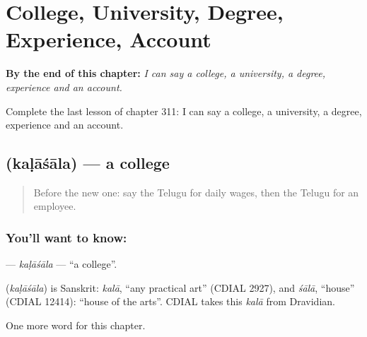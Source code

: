 
\chapter{College, University, Degree, Experience, Account}
\label{ch:te-college-university-degree-experience-account}

\begin{chapteropening}
\textbf{By the end of this chapter:} \emph{I can say a college, a university, a degree, experience and an account.}

Complete the last lesson of chapter 311: I can say a college, a university, a degree, experience and an account.
\end{chapteropening}

\section[\texorpdfstring{\te{కళాశాల} (kaḷāśāla)}{కళాశాల (kaḷāśāla)}]{ (kaḷāśāla) — a college}

\label{lesson:TE-C311-kalasala}



\begin{quote}
Before the new one: say the Telugu for daily wages, then the Telugu for an employee.
\end{quote}

\subsection*{You'll want to know: }
\textbf{} — \emph{kaḷāśāla} — \textquotedblleft{}a college\textquotedblright{}.

\begin{cousinweb}
\textbf{} (\emph{kaḷāśāla}) is Sanskrit: \emph{kalā}, \textquotedblleft{}any practical art\textquotedblright{} (CDIAL 2927), and \emph{śālā}, \textquotedblleft{}house\textquotedblright{} (CDIAL 12414): \textquotedblleft{}house of the arts\textquotedblright{}. CDIAL takes this \emph{kalā} from Dravidian.
\end{cousinweb}

\begin{grammarlens}[title={What you've built}]
One more word for this chapter.
\end{grammarlens}

